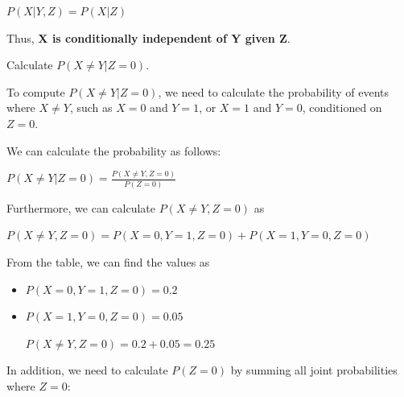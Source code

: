 \documentclass[12pt,letterpaper, onecolumn]{exam}
\begin{document}
\begin{questions}
\begin{parts}
\begin{subparts}
\begin{solution}
                \begin{center}
                    $\displaystyle{P(X|Y,Z) = P(X|Z)}$
                \end{center}

                Thus, \textbf{X is conditionally independent of Y given Z}.

            \end{solution}

            \pagebreak

            \subpart[5]
            Calculate $P (X \neq Y |Z = 0)$.
    
            \begin{solution}

                To compute $P(X \neq Y | Z = 0)$, we need to calculate the probability of events where $X \neq Y$, 
                such as $X=0$ and $Y=1$, or $X=1$ and $Y=0$, conditioned on $Z = 0$.

                We can calculate the probability as follows:

                \begin{center}
                    $\displaystyle{P(X \neq Y | Z = 0) = \frac{P(X \neq Y, Z = 0)}{P(Z=0)}}$
                \end{center}

                Furthermore, we can calculate $P(X \neq Y, Z = 0)$ as

                \begin{center}
                    $\displaystyle{P(X \neq Y, Z = 0) = P(X=0, Y=1, Z=0) + P(X=1, Y=0, Z=0)}$
                \end{center}

                From the table, we can find the values as

                \begin{itemize}
                    \item $P(X=0, Y=1, Z=0) = 0.2$
                    \item $P(X=1, Y=0, Z=0) = 0.05$
                    
                \begin{center}
                    $\displaystyle{P(X \neq Y, Z = 0) = 0.2 + 0.05 = 0.25}$
                \end{center}
                \end{itemize}

                In addition, we need to calculate $P(Z=0)$ by summing all joint probabilities where $Z=0$:


\end{solution}
\end{subparts}
\end{parts}
\end{questions}
\end{document}
